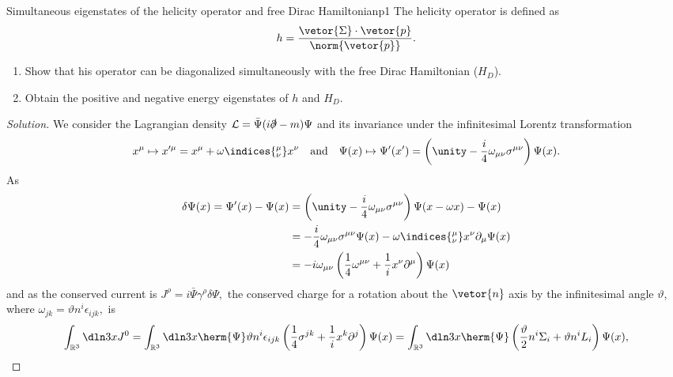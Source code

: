 \begin{problem}{Simultaneous eigenstates of the helicity operator and free Dirac Hamiltonian}{p1}
   The helicity operator is defined as
   \begin{equation*}
      h = \frac{\vetor{\Sigma}\cdot \vetor{p}}{\norm{\vetor{p}}}.
   \end{equation*}
   \begin{enumerate}[label=(\alph*)]
       \item Show that his operator can be diagonalized simultaneously with the free Dirac Hamiltonian (\(H_D\)).
       \item Obtain the positive and negative energy eigenstates of \(h\) and \(H_D\).
   \end{enumerate}
\end{problem}
\begin{proof}[Solution]
   We consider the Lagrangian density \(\mathcal{L} = \bar{\Psi} (i \slashed{\partial} - m) \Psi\) and its invariance under the infinitesimal Lorentz transformation 
   \begin{equation*}
      x^\mu \mapsto x'^\mu = x^\mu + \omega\indices{^\mu_\nu}x^\nu\quad\text{and}\quad\Psi(x) \mapsto \Psi'(x') = \left(\unity - \frac{i}{4} \omega_{\mu\nu} \sigma^{\mu\nu}\right)\Psi(x).
   \end{equation*}
   As
   \begin{align*}
      \delta \Psi(x) = \Psi'(x) - \Psi(x) &= \left(\unity - \frac{i}{4} \omega_{\mu\nu} \sigma^{\mu\nu}\right)\Psi(x - \omega x) - \Psi(x)\\
                                          &= -\frac{i}{4} \omega_{\mu\nu} \sigma^{\mu\nu}\Psi(x) - \omega\indices{^\mu_\nu} x^\nu\partial_\mu \Psi(x)\\
                                          &= -i \omega_{\mu\nu} \left(\frac14 \omega^{\mu\nu} + \frac1i x^\nu \partial^\mu\right)\Psi(x)
   \end{align*}
   and as the conserved current is \(J^\rho = i \bar{\Psi} \gamma^\rho \delta \Psi,\) the conserved charge for a rotation about the \(\vetor{n}\) axis by the infinitesimal angle \(\vartheta\), where \(\omega_{jk} = \vartheta n^i \epsilon_{ijk},\) is
   \begin{equation*}
      \int_{\mathbb{R}^3} \dln3x J^0 = \int_{\mathbb{R}^3} \dln3x \herm{\Psi} \vartheta n^i \epsilon_{ijk} \left(\frac14 \sigma^{jk} + \frac{1}{i} x^{k} \partial^j\right) \Psi(x) = \int_{\mathbb{R}^3} \dln3x \herm{\Psi} \left(\frac{\vartheta}2 n^i \Sigma_i + \vartheta n^i L_i\right)\Psi(x),

\end{equation*}
\end{proof}
